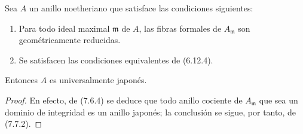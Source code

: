 \begin{corollary}[7.7.3]
\label{IV.2.s7.7.3-fr}
Sea $A$ un anillo noetheriano que satisface las condiciones siguientes:
\begin{enumerate}
\item[\emph{(i)}] Para todo ideal maximal $\mathfrak m$ de $A$, las fibras
formales de $A_{\mathfrak m}$ son geométricamente reducidas.
\item[\emph{(ii)}] Se satisfacen las condiciones equivalentes de \textup{(6.12.4)}.
\end{enumerate}

Entonces $A$ es universalmente japonés.
\end{corollary}

\begin{proof}
En efecto, de (7.6.4) se deduce que todo anillo cociente de
$A_{\mathfrak m}$ que sea un dominio de integridad es un anillo japonés;
la conclusión se sigue, por tanto, de (7.7.2).
\end{proof}
